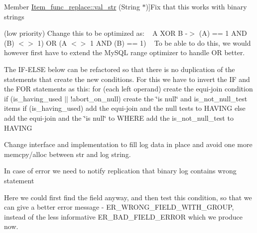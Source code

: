\begin{DoxyRefList}
%
Member \mbox{\hyperlink{classItem__func__replace_a339fa98601454ef99451c1c2daf5d1a4}{Item\+\_\+func\+\_\+replace\+:\+:val\+\_\+str}} (String $\ast$)]Fix that this works with binary strings  
\item[\label{todo__todo000032}%
\Hypertarget{todo__todo000032}%
Member \mbox{\hyperlink{classItem__func__xor_abf20b3f1b71cb4c4b588c5a04d77ba05}{Item\+\_\+func\+\_\+xor\+:\+:val\+\_\+int}} ()](low priority) Change this to be optimized as\+: ~\newline
 A X\+OR B -\/$>$ (A) == 1 A\+ND (B) $<$$>$ 1) OR (A $<$$>$ 1 A\+ND (B) == 1) ~\newline
 To be able to do this, we would however first have to extend the My\+S\+QL range optimizer to handle OR better. 
\item[\label{todo__todo000037}%
\Hypertarget{todo__todo000037}%
Member \mbox{\hyperlink{classItem__in__subselect_a6f5b5e6374b290d5efd086002d91ff92}{Item\+\_\+in\+\_\+subselect\+:\+:row\+\_\+value\+\_\+in\+\_\+to\+\_\+exists\+\_\+transformer}} (st\+\_\+select\+\_\+lex $\ast$select)]The IF-\/E\+L\+SE below can be refactored so that there is no duplication of the statements that create the new conditions. For this we have to invert the IF and the F\+OR statements as this\+: for (each left operand) create the equi-\/join condition if (is\+\_\+having\+\_\+used $\vert$$\vert$ !abort\+\_\+on\+\_\+null) create the \char`\"{}is null\char`\"{} and is\+\_\+not\+\_\+null\+\_\+test items if (is\+\_\+having\+\_\+used) add the equi-\/join and the null tests to H\+A\+V\+I\+NG else add the equi-\/join and the \char`\"{}is null\char`\"{} to W\+H\+E\+RE add the is\+\_\+not\+\_\+null\+\_\+test to H\+A\+V\+I\+NG  
\item[\label{todo__todo000028}%
\Hypertarget{todo__todo000028}%
Member \mbox{\hyperlink{classItem__param_aa9b9af6fd0ae3281fc3bbcd2ce6cf741}{Item\+\_\+param\+:\+:query\+\_\+val\+\_\+str}} (T\+HD $\ast$thd, String $\ast$str) const]
\begin{DoxyItemize}
\item Change interface and implementation to fill log data in place and avoid one more memcpy/alloc between str and log string.
\item In case of error we need to notify replication that binary log contains wrong statement  
\end{DoxyItemize}
\item[\label{todo__todo000029}%
\Hypertarget{todo__todo000029}%
Member \mbox{\hyperlink{classItem__ref_a6a78e05b0db89e799f61808c621b808f}{Item\+\_\+ref\+:\+:fix\+\_\+fields}} (T\+HD $\ast$, \mbox{\hyperlink{classItem}{Item}} $\ast$$\ast$)]Here we could first find the field anyway, and then test this condition, so that we can give a better error message -\/ E\+R\+\_\+\+W\+R\+O\+N\+G\+\_\+\+F\+I\+E\+L\+D\+\_\+\+W\+I\+T\+H\+\_\+\+G\+R\+O\+UP, instead of the less informative E\+R\+\_\+\+B\+A\+D\+\_\+\+F\+I\+E\+L\+D\+\_\+\+E\+R\+R\+OR which we produce now. 

\end{DoxyRefList}
